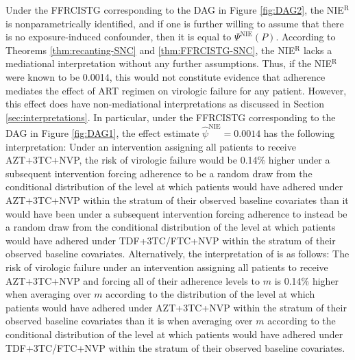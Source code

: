 \documentclass[12pt]{article}
\begin{document}
Under the FFRCISTG corresponding to the DAG in Figure \ref{fig:DAG2}, the NIE$^{\text{R}}$ is nonparametrically identified, and if one is further willing to assume that there is no exposure-induced confounder, then it is equal to $\Psi^{\text{NIE}}(P)$. According to Theorems \ref{thm:recanting-SNC} and \ref{thm:FFRCISTG-SNC}, the NIE$^{\text{R}}$ lacks a mediational interpretation without any further assumptions. Thus, if the NIE$^{\text{R}}$ were known to be 0.0014, this would not constitute evidence that adherence mediates the effect of ART regimen on virologic failure for any patient. However, this effect does have non-mediational interpretations as discussed in Section \ref{sec:interpretations}. In particular, under the FFRCISTG corresponding to the DAG in Figure \ref{fig:DAG1}, the effect estimate $\hat{\psi}^{\text{NIE}}=0.0014$ has the following interpretation: Under an intervention assigning all patients to receive AZT+3TC+NVP, the risk of virologic failure would be 0.14\% higher under a subsequent intervention forcing adherence to be a random draw from the conditional distribution of the level at which patients would have adhered under AZT+3TC+NVP within the stratum of their observed baseline covariates than it would have been under a subsequent intervention forcing adherence to instead be a random draw from the conditional distribution of the level at which patients would have adhered under TDF+3TC/FTC+NVP within the stratum of their observed baseline covariates. Alternatively, the interpretation of \cite{van2008direct} is as follows: The risk of virologic failure %
under an intervention assigning all patients to receive AZT+3TC+NVP and forcing all of their adherence levels to $m$ is 0.14\% higher when averaging over $m$ according to the distribution of the level at which patients would have adhered under AZT+3TC+NVP within the stratum of their observed baseline covariates %
than it is when averaging over $m$ according to the conditional distribution of the level at which patients would have adhered under TDF+3TC/FTC+NVP within the stratum of their observed baseline covariates.
\end{document}
